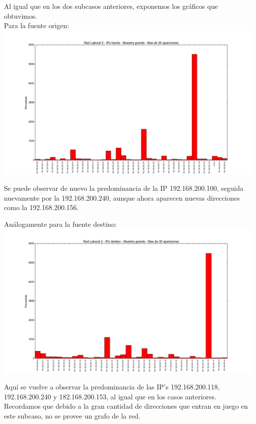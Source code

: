 \indent \indent Al igual que en los dos subcasos anteriores, exponemos los gráficos que obtuvimos.\\
\indent Para la fuente origen:\\


\includegraphics[scale=0.5,clip=true,trim=140 0 0 0]{graphics/laburo_src.png}

\indent Se puede observar de nuevo la predominancia de la IP 192.168.200.100, seguida nuevamente por la 192.168.200.240, aunque ahora aparecen nuevas direcciones como la 192.168.200.156.

\indent Análogamente para la fuente destino:\\

\includegraphics[scale=0.5,clip=true,trim=140 0 0 0]{graphics/laburo_dst.png}


\indent Aquí se vuelve a observar la predominancia de las IP's 192.168.200.118, 192.168.200.240 y 182.168.200.153, al igual que en los casos anteriores.\\

\indent Recordamos que debido a la gran cantidad de direcciones que entran en juego en este subcaso, no se provee un grafo de la red.\\

